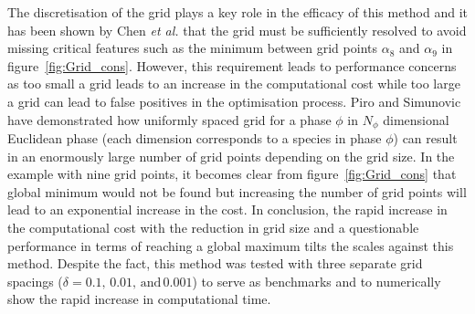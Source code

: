 The discretisation of the grid plays a key role in the efficacy of this method and it has been shown by Chen \textit{et al.} \cite{Chen93b} that the grid must be sufficiently resolved to avoid missing critical features such as the minimum between grid points $\alpha_8$ and $\alpha_9$ in figure~\ref{fig:Grid_cons}. However, this requirement leads to performance concerns as too small a grid leads to an increase in the computational cost while too large a grid can lead to false positives in the optimisation process.  Piro and Simunovic \cite{Piro16} have demonstrated how uniformly spaced grid for a phase $\phi$ in $N_\phi$ dimensional Euclidean phase (each dimension corresponds to a species in phase $\phi$) can result in an enormously large number of grid points depending on the grid size. In the example with nine grid points, it becomes clear from figure~\ref{fig:Grid_cons} that global minimum would not be found but increasing the number of grid points will lead to an exponential increase in the cost. In conclusion, the rapid increase in the computational cost with the reduction in grid size and a questionable performance in terms of reaching a global maximum tilts the scales against this method. Despite the fact, this method was tested with three separate grid spacings ($\delta = 0.1, \, 0.01, \,\text{and}\, 0.001$) to serve as benchmarks and to numerically show the rapid increase in computational time.
	
